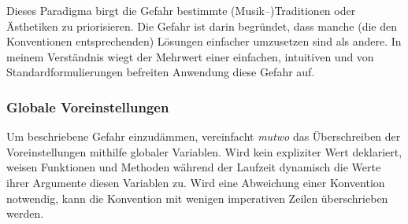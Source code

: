 \documentclass[12pt,a4paper,ngerman]{article}
\begin{document}
\bigskip

Dieses Paradigma birgt die Gefahr bestimmte (Musik--)Traditionen oder Ästhetiken zu priorisieren.
Die Gefahr ist darin begründet, dass manche (die den Konventionen entsprechenden) Lösungen einfacher umzusetzen sind als andere.
In meinem Verständnis wiegt der Mehrwert einer einfachen, intuitiven und von Standardformulierungen befreiten Anwendung diese Gefahr auf.

\subsubsection{Globale Voreinstellungen}

Um beschriebene Gefahr einzudämmen, vereinfacht \emph{mutwo} das Überschreiben der Voreinstellungen mithilfe globaler Variablen.
Wird kein expliziter Wert deklariert, weisen Funktionen und Methoden während der Laufzeit dynamisch die Werte ihrer Argumente diesen Variablen zu.
Wird eine Abweichung einer Konvention notwendig, kann die Konvention mit wenigen imperativen Zeilen überschrieben werden.

\vspace{-0.5cm}

\begin{center}
\end{center}
\end{document}
